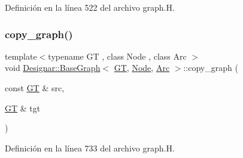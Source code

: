 Definición en la línea 522 del archivo graph.\+H.

\mbox{\label{class_designar_1_1_base_graph_ac34a3b513973c2ed43067934f71ace28}} 
\subsubsection{\texorpdfstring{copy\+\_\+graph()}{copy\_graph()}}
{\footnotesize\ttfamily template$<$typename GT , class Node , class Arc $>$ \\
void \hyperlink{class_designar_1_1_base_graph}{Designar\+::\+Base\+Graph}$<$ \hyperlink{demo-buildgraph_8_c_a3001c40d2c31ca87ed96cd7d1334a55e}{GT}, \hyperlink{namespace_designar_a5af326c65aa2bd26b26c410f2030d09e}{Node}, \hyperlink{namespace_designar_a3f55fb5513d62ff47cbc8f72b8e95d6f}{Arc} $>$\+::copy\+\_\+graph (\begin{DoxyParamCaption}\item[{const \hyperlink{demo-buildgraph_8_c_a3001c40d2c31ca87ed96cd7d1334a55e}{GT} \&}]{src,  }\item[{\hyperlink{demo-buildgraph_8_c_a3001c40d2c31ca87ed96cd7d1334a55e}{GT} \&}]{tgt }\end{DoxyParamCaption})\hspace{0.3cm}{\ttfamily [static]}}



Definición en la línea 733 del archivo graph.\+H.

\mbox{\label{class_designar_1_1_base_graph_a5208fcd131d919271e1d54f6e45ab3e9}} 
